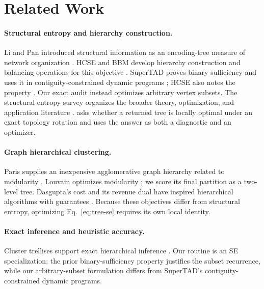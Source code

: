 \section{Related Work}
\paragraph{Structural entropy and hierarchy construction.}
Li and Pan introduced structural information as an encoding-tree measure of
network organization \cite{li2016}. HCSE and BBM develop hierarchy
construction and balancing operations for this objective \cite{pan2025}.
SuperTAD proves binary sufficiency and uses it in contiguity-constrained dynamic
programs \cite{zhang2021supertad}; HCSE also notes the property \cite{pan2025}.
Our exact audit instead optimizes arbitrary vertex subsets.
The structural-entropy survey organizes the broader theory, optimization, and
application literature \cite{su2025survey}.
\NEST asks whether a returned tree is locally optimal under an exact topology
rotation and uses the answer as both a diagnostic and an optimizer.

\paragraph{Graph hierarchical clustering.}
Paris supplies an inexpensive agglomerative graph hierarchy related to
modularity \cite{bonald2018paris}. Louvain optimizes modularity
\cite{blondel2008}; we score its final partition as a two-level tree.
Dasgupta's cost and its revenue dual have inspired hierarchical algorithms with
guarantees \cite{dasgupta2016,moseley2017}. Because these objectives differ
from structural entropy, optimizing Eq.~\eqref{eq:tree-se} requires its own
local identity.

\paragraph{Exact inference and heuristic accuracy.}
Cluster trellises support exact hierarchical inference \cite{macaluso2021}.
Our routine is an SE specialization:
the prior binary-sufficiency property justifies the subset recurrence, while
our arbitrary-subset formulation differs from SuperTAD's contiguity-constrained
dynamic programs.

